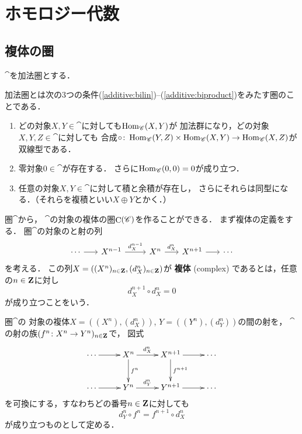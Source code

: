 \chapter{ホモロジー代数}
\setcounter{section}{2}

\section{複体の圏}

$\cat$を加法圏とする．
\begin{Attention*}
    加法圏とは次の3つの条件(\ref{additive:bilin})--(\ref{additive:biproduct})をみたす圏のことである．
    \begin{enumerate}
        \renewcommand{\labelenumi}{({\arabic{enumi}})}
        \item どの対象$X, Y\in\cat$に対しても$\mathop{\mathrm{Hom}}\nolimits_{\mathscr{C}}(X,Y)$が
        加法群になり，どの対象$X, Y, Z\in\cat$に対しても
        合成$\circ\colon\mathop{\mathrm{Hom}}\nolimits_{\mathscr{C}}(Y,Z)\times\mathop{\mathrm{Hom}}\nolimits_{\mathscr{C}}(X,Y)
        \to\mathop{\mathrm{Hom}}\nolimits_{\mathscr{C}}(X,Z)$が双線型である．\label{additive:bilin}
        \item 零対象$0\in\cat$が存在する．
        さらに$\mathop{\mathrm{Hom}}\nolimits_{\mathscr{C}}(0,0)=0$が成り立つ．\label{additive:zero}
        \item 任意の対象$X, Y\in\cat$に対して積と余積が存在し，
        さらにそれらは同型になる．（それらを複積といい$X\oplus Y$とかく．）\label{additive:biproduct}
    \end{enumerate}
\end{Attention*}
圏$\cat$から，
$\cat$の対象の複体の圏$\mathop{\mathrm{C}}\nolimits(\mathscr{C})$を作ることができる．
まず複体の定義をする．
圏$\cat$の対象のと射の列
\begin{equation}\label{eq:complex}
    \begin{tikzcd}[column sep=0.6cm]
        \cdots
        \arrow[r]
        &
        X^{n-1}
        \arrow[r,"d_X^{n-1}"] 
        &[+0.3cm]%
        X^n
        \arrow[r,"d_X^{n}"]
        &%
        X^{n+1}
        \arrow[r, ""] 
        &%
        \cdots
    \end{tikzcd}
\end{equation}
を考える．
この列$X=\left((X^n)_{n\in\mathbf{Z}},(d_X^{n})_{n\in\mathbf{Z}}\right)$が
\textbf{複体} (complex) であるとは，任意の$n\in\mathbf{Z}$に対し
\begin{equation}
    d_X^{n+1}\circ d_X^{n}=0
\end{equation}
が成り立つことをいう．

圏$\cat$の
対象の複体$X=((X^n),(d_X^{n}))$, $Y=((Y^n),(d_Y^{n}))$の間の射を，
$\cat$の射の族$(f^n\colon X^n\to Y^n)_{n\in\mathbf{Z}}$で，
図式
\begin{equation*}
    \vcenter{\xymatrix@C=26pt@R=26pt{
    \cdots \ar[r]
    & 
    X^{n}
    \ar[r]^-{d_X^n}
    \ar[d]^-{f^n}
    &
    X^{n+1}
    \ar[r]
    \ar[d]^-{f^{n+1}} 
    &\cdots
    \\
    \cdots \ar[r]
    & 
    Y^{n}
    \ar[r]^-{d_Y^n}
    &
    Y^{n+1}
    \ar[r]
    &\cdots
    }}
\end{equation*}
を可換にする，すなわちどの番号$n\in\mathbf{Z}$に対しても
\begin{equation}
    d_Y^n\circ f^n=f^{n+1}\circ d_X^n 
\end{equation}
が成り立つものとして定める．

